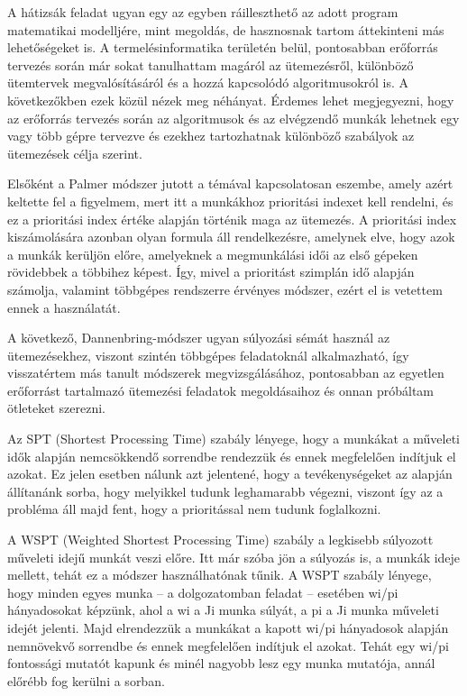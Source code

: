 
A hátizsák feladat ugyan egy az egyben ráilleszthető az adott program matematikai modelljére, mint megoldás, de hasznosnak tartom áttekinteni más lehetőségeket is. A termelésinformatika területén belül, pontosabban erőforrás tervezés során már sokat tanulhattam magáról az ütemezésről, különböző ütemtervek megvalósításáról és a hozzá kapcsolódó algoritmusokról is. A következőkben ezek közül nézek meg néhányat. Érdemes lehet megjegyezni, hogy az erőforrás tervezés során az algoritmusok és az elvégzendő munkák lehetnek egy vagy több gépre tervezve és ezekhez tartozhatnak különböző szabályok az ütemezések célja szerint.


Elsőként a Palmer módszer jutott a témával kapcsolatosan eszembe, amely azért keltette fel a figyelmem, mert itt a munkákhoz prioritási indexet kell rendelni, és ez a prioritási index értéke alapján történik maga az ütemezés. A prioritási index kiszámolására azonban olyan formula áll rendelkezésre, amelynek elve, hogy azok a munkák kerüljön előre, amelyeknek a megmunkálási idői az első gépeken rövidebbek a többihez képest. Így, mivel a prioritást szimplán idő alapján számolja, valamint többgépes rendszerre érvényes módszer, ezért el is vetettem ennek a használatát.\cite{palmer}


A következő, Dannenbring-módszer ugyan súlyozási sémát használ az ütemezésekhez, viszont szintén többgépes feladatoknál alkalmazható, így visszatértem más tanult módszerek megvizsgálásához, pontosabban az egyetlen erőforrást tartalmazó ütemezési feladatok megoldásaihoz és onnan próbáltam ötleteket szerezni.



Az SPT (Shortest Processing Time) szabály lényege, hogy a munkákat a műveleti idők alapján nemcsökkendő sorrendbe rendezzük és ennek megfelelően indítjuk el azokat. Ez jelen esetben nálunk azt jelentené, hogy a tevékenységeket az alapján állítanánk sorba, hogy melyikkel tudunk leghamarabb végezni, viszont így az a probléma áll majd fent, hogy a prioritással nem tudunk foglalkozni.\cite{sptwspt}



A WSPT (Weighted Shortest Processing Time) szabály a legkisebb súlyozott műveleti idejű munkát veszi előre. Itt már szóba jön a súlyozás is, a munkák ideje mellett, tehát ez a módszer használhatónak tűnik. A WSPT szabály lényege, hogy minden egyes munka – a dolgozatomban feladat – esetében wi/pi hányadosokat képzünk, ahol a wi a Ji munka súlyát, a pi a Ji munka műveleti idejét jelenti. Majd elrendezzük a munkákat a kapott wi/pi hányadosok alapján nemnövekvő sorrendbe és ennek megfelelően indítjuk el azokat.  Tehát egy wi/pi fontossági mutatót kapunk és minél nagyobb lesz egy munka mutatója, annál előrébb fog kerülni a sorban.\cite{sptwspt}

